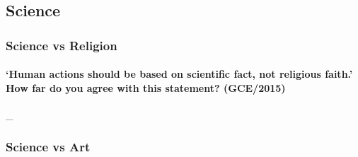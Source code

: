 \documentclass[../../main]{subfiles}
\begin{document}
\subsection{Science}

\subsubsection{Science vs Religion}

\paragraph{
`Human actions should be based on scientific fact, not religious faith.' How far do you agree with this statement? (GCE/2015)} \_

\subsubsection{Science vs Art}
\end{document}
